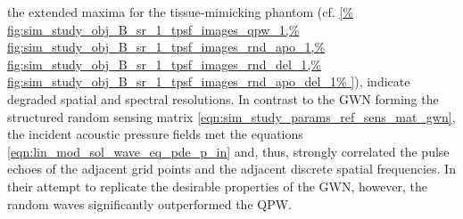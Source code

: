 the extended maxima for
the tissue-mimicking phantom
(cf. \cref{%
  fig:sim_study_obj_B_sr_1_tpsf_images_qpw_1,%
  fig:sim_study_obj_B_sr_1_tpsf_images_rnd_apo_1,%
  fig:sim_study_obj_B_sr_1_tpsf_images_rnd_del_1,%
  fig:sim_study_obj_B_sr_1_tpsf_images_rnd_apo_del_1%
}), indicate
degraded spatial and
spectral resolutions.
In contrast to
the \ac{GWN} forming
the structured random sensing matrix
\eqref{eqn:sim_study_params_ref_sens_mat_gwn},
the incident acoustic pressure fields met
the  equations
\eqref{eqn:lin_mod_sol_wave_eq_pde_p_in} and, thus, strongly correlated
the pulse echoes of
the adjacent grid points and
the adjacent discrete spatial frequencies.
In
their attempt to replicate
the desirable properties of
the \ac{GWN}, however,
the random waves significantly outperformed
the \ac{QPW}.

